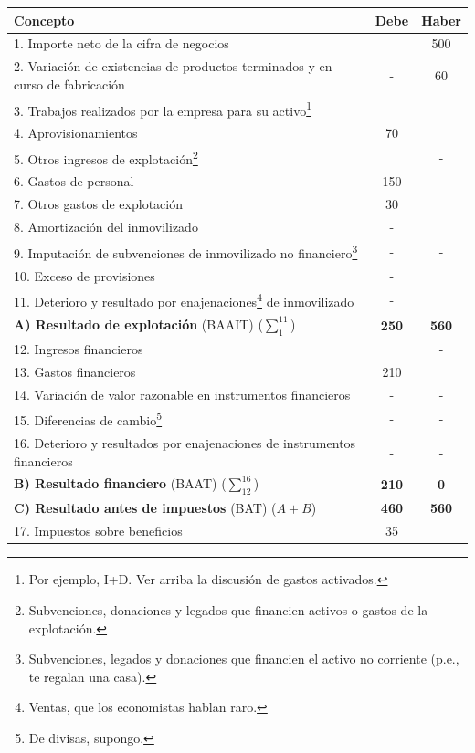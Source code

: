 \documentclass[nochap,palatino,shortheader]{apuntes}
\begin{document}
\begin{table}[hbtp]
\centering
\begin{minipage}{\textwidth}
\footnotesize
\begin{tabular}{l|c|c}
\textbf{Concepto} & \textbf{Debe} & \textbf{Haber} \\ \toprule
1. Importe neto de la cifra de negocios & & 500 \\
2. Variación de existencias de productos terminados y en curso de fabricación & - & 60 \\
3. Trabajos realizados por la empresa para su activo\footnote{Por ejemplo, I+D. Ver arriba la discusión de gastos activados.} & - & \\
4. Aprovisionamientos & 70 &  \\
5. Otros ingresos de explotación\footnote{Subvenciones, donaciones y legados que financien activos o gastos de la explotación.} & & - \\
6. Gastos de personal & 150 & \\
7. Otros gastos de explotación & 30 & \\
8. Amortización del inmovilizado & - & \\
9. Imputación de subvenciones de inmovilizado no financiero\footnote{Subvenciones, legados y donaciones que financien el activo no corriente (p.e., te regalan una casa).} & - & - \\
10. Exceso de provisiones & - & \\
11. Deterioro y resultado por enajenaciones\footnote{Ventas, que los economistas hablan raro.} de inmovilizado & - & \\ \midrule
\textbf{A) Resultado de explotación} (BAAIT) ($\sum_1^{11}$) & \textbf{250} & \textbf{560} \\ \midrule
12. Ingresos financieros & & - \\
13. Gastos financieros & 210 & \\
14. Variación de valor razonable en instrumentos financieros & - & - \\
15. Diferencias de cambio\footnote{De divisas, supongo.} & - & - \\
16. Deterioro y resultados por enajenaciones de instrumentos financieros & - & - \\ \midrule
\textbf{B) Resultado financiero} (BAAT) ($\sum_{12}^{16}$) & \textbf{210} & \textbf{0} \\ \midrule
\textbf{C) Resultado antes de impuestos} (BAT) ($A + B$) & \textbf{460} & \textbf{560} \\ \midrule
17. Impuestos sobre beneficios & 35 & \\ \midrule

\end{tabular}
\end{minipage}
\end{table}
\end{document}
